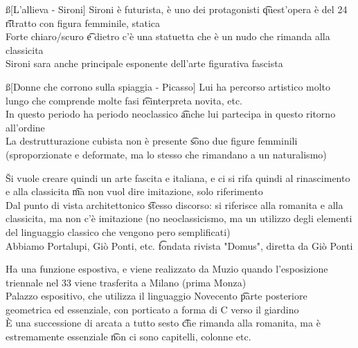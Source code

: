 \documentclass[12pt]{article}
\begin{document}
\ss[L'allieva - Sironi]
Sironi è futurista, è uno dei protagonisti \t quest'opera è del 24 \t ritratto con figura femminile, statica \\
Forte chiaro/scuro \t e dietro c'è una statuetta che è un nudo che rimanda alla classicita \\
Sironi sara anche principale esponente dell'arte figurativa fascista

\ss[Donne che corrono sulla spiaggia - Picasso]
Lui ha percorso artistico molto lungo che comprende molte fasi \t reinterpreta novita, etc. \\
In questo periodo ha periodo neoclassico \t anche lui partecipa in questo ritorno all'ordine \\
La destrutturazione cubista non è presente \t sono due figure femminili (sproporzionate e deformate, ma lo stesso che rimandano a un naturalismo)

\v

Si vuole creare quindi un arte fascita e italiana, e ci si rifa quindi al rinascimento e alla classicita \t ma non vuol dire imitazione, solo riferimento \\
Dal punto di vista architettonico \t stesso discorso: si riferisce alla romanita e alla classicita, ma non c'è imitazione (no neoclassicismo, ma un utilizzo degli elementi del linguaggio classico che vengono pero semplificati) \\
Abbiamo Portalupi, Giò Ponti, etc. \t fondata rivista "Domus", diretta da Giò Ponti

Ha una funzione espostiva, e viene realizzato da Muzio quando l'esposizione triennale nel 33 viene trasferita a Milano (prima Monza) \\
Palazzo espositivo, che utilizza il linguaggio Novecento \t parte posteriore geometrica ed essenziale, con porticato a forma di C verso il giardino \\
È una successione di arcata a tutto sesto \t che rimanda alla romanita, ma è estremamente essenziale \t non ci sono capitelli, colonne etc.
\end{document}
